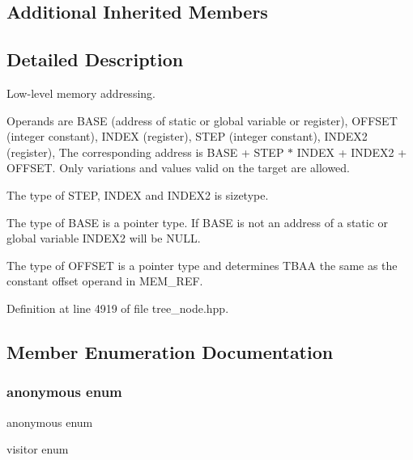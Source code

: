 \subsection*{Additional Inherited Members}


\subsection{Detailed Description}
Low-\/level memory addressing. 

Operands are B\+A\+SE (address of static or global variable or register), O\+F\+F\+S\+ET (integer constant), I\+N\+D\+EX (register), S\+T\+EP (integer constant), I\+N\+D\+E\+X2 (register), The corresponding address is B\+A\+SE + S\+T\+EP $\ast$ I\+N\+D\+EX + I\+N\+D\+E\+X2 + O\+F\+F\+S\+ET. Only variations and values valid on the target are allowed.

The type of S\+T\+EP, I\+N\+D\+EX and I\+N\+D\+E\+X2 is sizetype.

The type of B\+A\+SE is a pointer type. If B\+A\+SE is not an address of a static or global variable I\+N\+D\+E\+X2 will be N\+U\+LL.

The type of O\+F\+F\+S\+ET is a pointer type and determines T\+B\+AA the same as the constant offset operand in M\+E\+M\+\_\+\+R\+EF. 

Definition at line 4919 of file tree\+\_\+node.\+hpp.



\subsection{Member Enumeration Documentation}
\mbox{\label{structtarget__mem__ref461_ac8c49af34df2d8320711006226118bac}} 
\subsubsection{\texorpdfstring{anonymous enum}{anonymous enum}}
{\footnotesize\ttfamily anonymous enum}



visitor enum 

